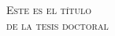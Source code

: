 %

%
\pagestyle{empty}
\dosenblanco

\begin{center}
  \scshape%
  Este es el t\'{i}tulo \\
  de la tesis doctoral \\
\end{center}

\cleardoublepage

%
